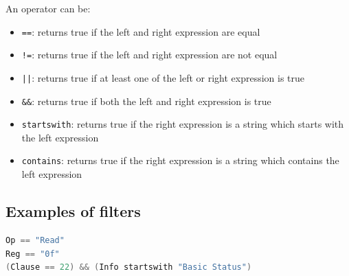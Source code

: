 An operator can be:
\begin{itemize}
\item \texttt{==}: returns true if the left and right expression are equal
\item \texttt{!=}: returns true if the left and right expression are not equal
\item \texttt{||}: returns true if at least one of the left or right expression is true
\item \texttt{\&\&}: returns true if both the left and right expression is true
\item \texttt{startswith}: returns true if the right expression is a string which starts with the left expression
\item \texttt{contains}: returns true if the right expression is a string which contains the left expression
\end{itemize}

\subsection{Examples of filters}

\begin{lstlisting}[language=C]
Op == "Read"
Reg == "0f"
(Clause == 22) && (Info startswith "Basic Status")
\end{lstlisting}
